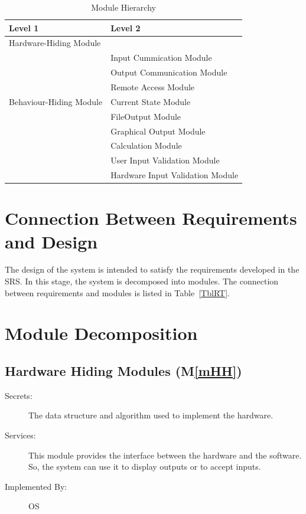 \documentclass[12pt, titlepage]{article}
\newcommand{\mref}[1]{M\ref{#1}}
\begin{document}
\begin{table}[h!]
\centering
\begin{tabular}{p{} p{}}
\toprule
\textbf{Level 1} & \textbf{Level 2}\\
\midrule

{Hardware-Hiding Module} & ~ \\
\midrule

\multirow{7}{0.3\textwidth}{Behaviour-Hiding Module}
& Input Cummication Module\\
& Output Communication Module\\
& Remote Access Module\\
& Current State Module\\
& FileOutput Module\\
& Graphical Output Module\\ 
\midrule

\multirow{3}{0.3\textwidth}{Software Decision Module}
& Calculation Module\\
& User Input Validation Module \\
& Hardware Input Validation Module\\ 
\bottomrule

\end{tabular}
\caption{Module Hierarchy}
\label{TblMH}
\end{table}

\section{Connection Between Requirements and Design} \label{SecConnection}

The design of the system is intended to satisfy the requirements developed in
the SRS. In this stage, the system is decomposed into modules. The connection
between requirements and modules is listed in Table~\ref{TblRT}.

\section{Module Decomposition} \label{SecMD}

\subsection{Hardware Hiding Modules (\mref{mHH})}

\begin{description}
\item[Secrets:]The data structure and algorithm used to implement the hardware.
\item[Services:]This module provides the interface between the hardware and the
  software. So, the system can use it to display outputs or to accept inputs.
\item[Implemented By:] OS
\end{description}
\end{document}
